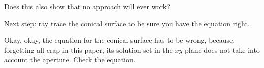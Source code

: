 \documentclass{birkjour}
\theoremstyle{definition}
\theoremstyle{remark}
\numberwithin{equation}{section}
\begin{document}
Does this also show that no approach will ever work?

Next step: ray trace the conical surface to be sure you have the equation right.

Okay, okay, the equation for the conical surface has to be wrong, because, forgetting
all crap in this paper, its solution set in the $xy$-plane does not take into account
the aperture.  Check the equation.
\end{document}
